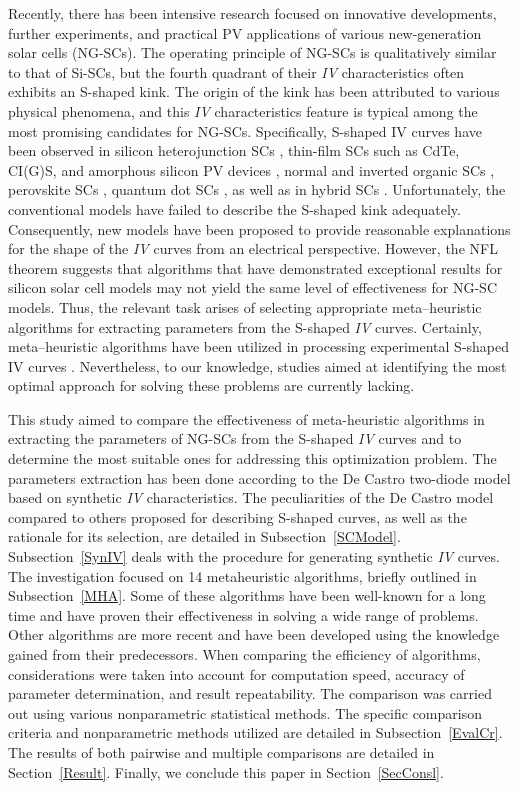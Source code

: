 \documentclass[a4paper,fleqn]{cas-sc}
\begin{document}
Recently, there has been intensive research focused on innovative developments,
further experiments, and practical PV applications of various new-generation solar cells (NG-SCs).
The operating principle of NG-SCs is qualitatively similar to that of Si-SCs,
but the fourth quadrant of their \emph{IV} characteristics often exhibits an S-shaped kink.
The origin of the kink has been attributed to various physical phenomena,
and this \emph{IV} characteristics feature is typical among the most promising candidates for NG-SCs.
Specifically, S-shaped IV curves have been observed in silicon heterojunction SCs \cite{Saive2019},
thin-film SCs such as CdTe, CI(G)S, and amorphous silicon PV devices \cite{Saive2019,Roland2016},
normal and inverted organic SCs \cite{Gaur2014,Tran2017,Lastra2019},
perovskite SCs \cite{Saive2019,Xu2016},
quantum dot SCs \cite{Gao2011,Yu2019a},
as well as in hybrid SCs \cite{VeinbergVidal2016,Romero2017,Finck2013}.
Unfortunately, the conventional models have failed to describe the S-shaped kink adequately.
Consequently, new models have been proposed to provide reasonable explanations for the shape of the \emph{IV} curves from an electrical perspective.
However, the NFL theorem suggests that algorithms that have demonstrated exceptional results
for silicon solar cell models may not yield the same level of effectiveness for NG-SC models.
Thus, the relevant task arises of selecting appropriate meta--heuristic algorithms for extracting
parameters from the S-shaped \emph{IV} curves.
Certainly, meta--heuristic algorithms have been utilized in processing experimental S-shaped IV curves \cite{Pillai2017}.
Nevertheless, to our knowledge, studies aimed at identifying the most optimal approach for solving these problems are currently lacking.

This study aimed to compare the effectiveness of meta-heuristic algorithms in extracting the parameters of NG-SCs from the S-shaped \emph{IV} curves 
and to determine the most suitable ones for addressing this optimization problem. 
The parameters extraction has been done according to the De Castro two-diode model based on synthetic \emph{IV} characteristics.
The peculiarities of the De Castro model compared to others proposed for describing S-shaped curves,
as well as the rationale for its selection, are detailed in Subsection~\ref{SCModel}.
Subsection~\ref{SynIV} deals with the procedure for generating synthetic \emph{IV} curves.
The investigation focused on 14 metaheuristic algorithms, briefly outlined in Subsection~\ref{MHA}.
Some of these algorithms have been well-known for a long time and have proven their effectiveness in solving a wide range of problems.
Other algorithms are more recent and have been developed using the knowledge gained from their predecessors.
When comparing the efficiency of algorithms, considerations were taken into account for computation speed, accuracy of parameter determination, and result repeatability.
The comparison was carried out using various nonparametric statistical methods.
The specific comparison criteria and nonparametric methods utilized are detailed in Subsection~\ref{EvalCr}.
The results of both pairwise and multiple comparisons are detailed in Section~\ref{Result}.
Finally, we conclude this paper in Section~\ref{SecConsl}.
\end{document}
